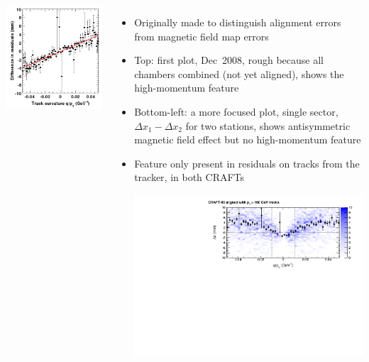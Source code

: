 \documentclass[compress]{beamer}
\begin{document}
\begin{frame}
\begin{columns}
\includegraphics[width=\linewidth]{old_Deltax1-Deltax2_vs_qoverpT.png}
\begin{itemize}
\item Originally made to distinguish alignment errors from magnetic field map errors
\item Top: first plot, Dec~2008, rough because all chambers combined
  (not yet aligned), shows the high-momentum feature
\item Bottom-left: a more focused plot, single sector, $\Delta x_1 - \Delta
  x_2$ for two stations, shows antisymmetric magnetic field effect but
  no high-momentum feature
\item Feature only present in residuals on tracks from
  the tracker, in both CRAFTs

\vspace{0.1 cm}
\includegraphics[width=\linewidth]{residuals_real.pdf}
\end{itemize}
\end{columns}
\end{frame}
\end{document}
